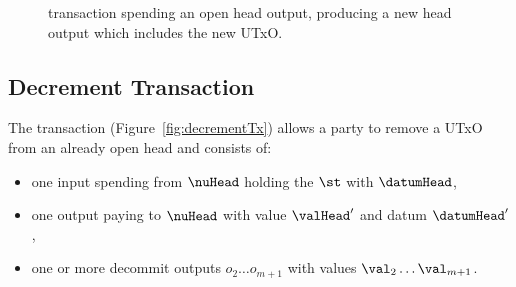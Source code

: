 \begin{figure}[H]
	\centering
	
	\caption{\mtxIncrement{} transaction spending an open head output,
		producing a new head output which includes the new UTxO.}\label{fig:incrementTx}
\end{figure}

\subsection{Decrement Transaction}\label{sec:decrement-tx}

\noindent The \mtxDecrement{} transaction (Figure~\ref{fig:decrementTx}) allows
a party to remove a UTxO from an already open head and consists of:

\begin{itemize}
	\item one input spending from $\nuHead$ holding the $\st$ with $\datumHead$,
	\item one output paying to $\nuHead$ with value $\valHead'$ and
	      datum $\datumHead'$,
	\item one or more decommit outputs $o_{2} \dots o_{m+1}$ with values $\val_{2} \dots \val_{m+1} $.
\end{itemize}

